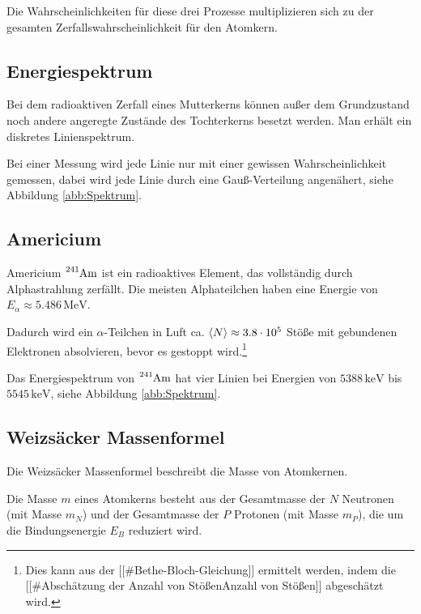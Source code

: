 \documentclass[12pt,a4paper]{scrartcl}
\numberwithin{equation}{section} %
\renewcommand{\[}{} %
\renewcommand{\]}{\noindent} %
\begin{document}
Die Wahrscheinlichkeiten für diese drei Prozesse multiplizieren sich zu
der gesamten Zerfallswahrscheinlichkeit für den Atomkern.

\hypertarget{energiespektrum}{%
\subsection{Energiespektrum}\label{energiespektrum}}

Bei dem radioaktiven Zerfall eines Mutterkerns können außer dem
Grundzustand noch andere angeregte Zustände des Tochterkerns besetzt
werden. Man erhält ein diskretes Linienspektrum.

Bei einer Messung wird jede Linie nur mit einer gewissen
Wahrscheinlichkeit gemessen, dabei wird jede Linie durch eine
Gauß-Verteilung angenähert, siehe Abbildung \ref{abb:Spektrum}.

\hypertarget{americium}{%
\subsection{Americium}\label{americium}}

Americium \(\ce{^{241}Am}\) ist ein radioaktives Element, das
vollständig durch Alphastrahlung zerfällt. Die meisten Alphateilchen
haben eine Energie von \(E_\alpha\approx 5.486 \mathrm{\,MeV}\).

Dadurch wird ein \(\alpha\)-Teilchen in Luft ca.
\(\expval{N} \approx 3.8 \cdot 10^5\) Stöße mit gebundenen Elektronen
absolvieren, bevor es gestoppt wird.\footnote{Dies kann aus der
  {[}{[}\#Bethe-Bloch-Gleichung{]}{]} ermittelt werden, indem die
  {[}{[}\#Abschätzung der Anzahl von Stößen\textbar Anzahl von
  Stößen{]}{]} abgeschätzt wird.}

Das Energiespektrum von \(\ce{^{241}Am}\) hat vier Linien bei Energien
von \(5388\mathrm{\,keV}\) bis \(5545\mathrm{\,keV}\), siehe Abbildung \ref{abb:Spektrum}.

\hypertarget{weizsuxe4cker-massenformel}{%
\subsection{Weizsäcker Massenformel}\label{weizsuxe4cker-massenformel}}

Die Weizsäcker Massenformel beschreibt die Masse von Atomkernen.

Die Masse \(m\) eines Atomkerns besteht aus der Gesamtmasse der \(N\)
Neutronen (mit Masse \(m_N\)) und der Gesamtmasse der \(P\) Protonen
(mit Masse \(m_P\)), die um die Bindungsenergie \(E_B\) reduziert wird.
\end{document}
